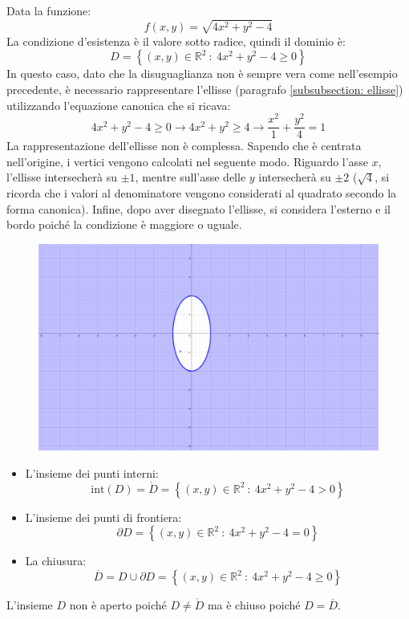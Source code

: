 \documentclass[a4paper]{article}
\begin{document}
	\noindent
	Data la funzione:
	\begin{equation*}
		f\left(x,y\right) = \sqrt{4x^{2} + y^{2} - 4}
	\end{equation*}
	La condizione d'esistenza è il valore sotto radice, quindi il dominio è:
	\begin{equation*}
		D = \left\{\left(x,y\right) \in \mathbb{R}^{2} \: : \: 4x^{2} + y^{2} - 4 \ge 0\right\}
	\end{equation*}
	In questo caso, dato che la disuguaglianza non è sempre vera come nell'esempio precedente, è necessario rappresentare l'ellisse (paragrafo \ref{subsubsection: ellisse}) utilizzando l'equazione canonica che si ricava:
	\begin{equation*}
		4x^{2} + y^{2} - 4 \ge 0 \rightarrow 4x^{2} + y^{2} \ge 4 \rightarrow \dfrac{x^{2}}{1} + \dfrac{y^{2}}{4} = 1
	\end{equation*}
	La rappresentazione dell'ellisse non è complessa. Sapendo che è centrata nell'origine, i vertici vengono calcolati nel seguente modo. Riguardo l'asse $x$, l'ellisse intersecherà su $\pm 1$, mentre sull'asse delle $y$ intersecherà su $\pm 2$ ($\sqrt{4}$, si ricorda che i valori al denominatore vengono considerati al quadrato secondo la forma canonica). Infine, dopo aver disegnato l'ellisse, si considera l'esterno e il bordo poiché la condizione è maggiore o uguale.
	\begin{figure}[!htp]
		\centering
		\includegraphics[width=.63\textwidth]{img/dominio_di_funzioni-3.pdf}
	\end{figure}
	\begin{itemize}
		\item L'insieme dei punti interni:
		\begin{equation*}
			\mathrm{int}\left(D\right) = \mathring{D} = \left\{\left(x,y\right) \in \mathbb{R}^{2} \: : \: 4x^{2} + y^{2} - 4 > 0\right\}
		\end{equation*}

		\item L'insieme dei punti di frontiera:
		\begin{equation*}
			\partial D = \left\{\left(x,y\right) \in \mathbb{R}^{2} \: : \: 4x^{2} + y^{2} - 4 = 0\right\}
		\end{equation*}

		\item La chiusura:
		\begin{equation*}
			\overline{D} = D \cup \partial D = \left\{\left(x,y\right) \in \mathbb{R}^{2} \: : \: 4x^{2} + y^{2} - 4 \ge 0\right\}
		\end{equation*}
	\end{itemize}
	L'insieme $D$ non è aperto poiché $D \ne \mathring{D}$ ma è chiuso poiché $D = \overline{D}$.\newpage
\end{document}
